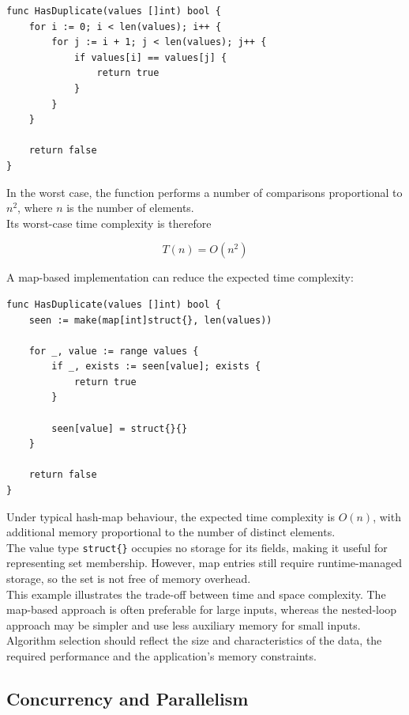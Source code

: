 \begin{lstlisting}
func HasDuplicate(values []int) bool {
    for i := 0; i < len(values); i++ {
        for j := i + 1; j < len(values); j++ {
            if values[i] == values[j] {
                return true
            }
        }
    }

    return false
}
\end{lstlisting}

In the worst case, the function performs a number of comparisons proportional to \(n^2\), where \(n\) is the number of elements.\\

Its worst-case time complexity is therefore

\[
T(n) = O(n^2)
\]

A map-based implementation can reduce the expected time complexity:

\begin{lstlisting}
func HasDuplicate(values []int) bool {
    seen := make(map[int]struct{}, len(values))

    for _, value := range values {
        if _, exists := seen[value]; exists {
            return true
        }

        seen[value] = struct{}{}
    }

    return false
}
\end{lstlisting}

Under typical hash-map behaviour, the expected time complexity is \(O(n)\), with additional memory proportional to the number of distinct elements.\\

The value type \texttt{struct\{\}} occupies no storage for its fields, making it useful for representing set membership. However, map entries still require runtime-managed storage, so the set is not free of memory overhead.\\

This example illustrates the trade-off between time and space complexity. The map-based approach is often preferable for large inputs, whereas the nested-loop approach may be simpler and use less auxiliary memory for small inputs.\\

Algorithm selection should reflect the size and characteristics of the data, the required performance and the application's memory constraints.\\

\subsection{Concurrency and Parallelism}

